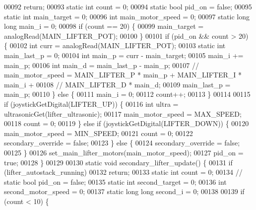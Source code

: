 \begin{DoxyCode}
00092     \textcolor{keywordflow}{return};
00093   \textcolor{keyword}{static} \textcolor{keywordtype}{int} count = 0;
00094   \textcolor{keyword}{static} \textcolor{keywordtype}{bool} pid\_on = \textcolor{keyword}{false};
00095   \textcolor{keyword}{static} \textcolor{keywordtype}{int} main\_target = 0;
00096   \textcolor{keywordtype}{int} main\_motor\_speed = 0;
00097   \textcolor{keyword}{static} \textcolor{keywordtype}{long} \textcolor{keywordtype}{long} main\_i = 0;
00098   \textcolor{keywordflow}{if} (count == 20) \{
00099     main\_target = analogRead(MAIN_LIFTER_POT);
00100   \}
00101   \textcolor{keywordflow}{if} (pid\_on && count > 20) \{
00102     \textcolor{keywordtype}{int} curr = analogRead(MAIN_LIFTER_POT);
00103     \textcolor{keyword}{static} \textcolor{keywordtype}{int} main\_last\_p = 0;
00104     \textcolor{keywordtype}{int} main\_p = curr - main\_target;
00105     main\_i += main\_p;
00106     \textcolor{keywordtype}{int} main\_d = main\_last\_p - main\_p;
00107     \textcolor{comment}{// main\_motor\_speed = MAIN\_LIFTER\_P * main\_p + MAIN\_LIFTER\_I * main\_i +}
00108     \textcolor{comment}{// MAIN\_LIFTER\_D * main\_d;}
00109     main\_last\_p = main\_p;
00110   \} \textcolor{keywordflow}{else} \{
00111     main\_i = 0;
00112     count++;
00113   \}
00114 
00115   \textcolor{keywordflow}{if} (joystickGetDigital(LIFTER_UP)) \{
00116     \textcolor{keywordtype}{int} ultra = ultrasonicGet(lifter_ultrasonic);
00117     main\_motor\_speed = MAX_SPEED;
00118     count = 0;
00119   \} \textcolor{keywordflow}{else} \textcolor{keywordflow}{if} (joystickGetDigital(LIFTER_DOWN)) \{
00120     main\_motor\_speed = MIN_SPEED;
00121     count = 0;
00122     secondary_override = \textcolor{keyword}{false};
00123   \} \textcolor{keywordflow}{else} \{
00124     secondary_override = \textcolor{keyword}{false};
00125   \}
00126   set_main_lifter_motors(main\_motor\_speed);
00127   pid\_on = \textcolor{keyword}{true};
00128 \}
00129 
00130 \textcolor{keyword}{static} \textcolor{keywordtype}{void} secondary_lifter_update() \{
00131   \textcolor{keywordflow}{if} (lifter_autostack_running)
00132     \textcolor{keywordflow}{return};
00133   \textcolor{keyword}{static} \textcolor{keywordtype}{int} count = 0;
00134   \textcolor{comment}{// static bool pid\_on = false;}
00135   \textcolor{keyword}{static} \textcolor{keywordtype}{int} second\_target = 0;
00136   \textcolor{keywordtype}{int} second\_motor\_speed = 0;
00137   \textcolor{keyword}{static} \textcolor{keywordtype}{long} \textcolor{keywordtype}{long} second\_i = 0;
00138 
00139   \textcolor{keywordflow}{if} (count < 10) \{

\end{DoxyCode}
